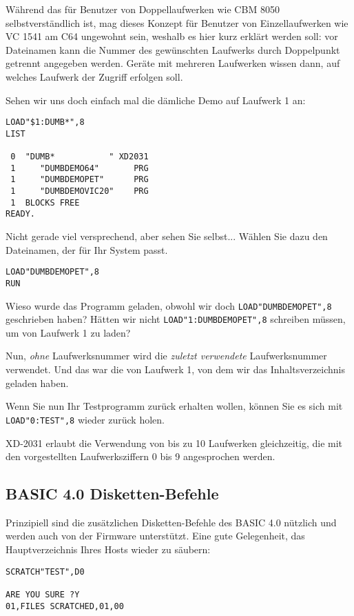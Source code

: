 \documentclass[10pt,a4paper]{scrartcl}		%
\begin{document}
Während das für Benutzer von Doppellaufwerken
wie CBM 8050 selbstverständlich ist, mag dieses Konzept für Benutzer
von Einzellaufwerken wie VC 1541 am C64 ungewohnt sein, weshalb es
hier kurz erklärt werden soll: vor Dateinamen kann die Nummer des gewünschten
Laufwerks durch Doppelpunkt getrennt angegeben werden. Geräte mit
mehreren Laufwerken wissen dann, auf welches Laufwerk der Zugriff
erfolgen soll.

Sehen wir uns doch einfach mal die dämliche Demo auf Laufwerk 1 an:

\begin{verbatim}
LOAD"$1:DUMB*",8
LIST

 0  "DUMB*           " XD2031
 1     "DUMBDEMO64"       PRG
 1     "DUMBDEMOPET"      PRG
 1     "DUMBDEMOVIC20"    PRG
 1  BLOCKS FREE
READY.
\end{verbatim}

Nicht gerade viel versprechend, aber sehen Sie selbst... 
Wählen Sie dazu den Dateinamen, der für Ihr System passt.

\begin{verbatim}
LOAD"DUMBDEMOPET",8
RUN
\end{verbatim}

Wieso wurde das Programm geladen, obwohl wir doch \texttt{LOAD"DUMBDEMOPET",8} 
geschrieben haben? Hätten wir nicht \texttt{LOAD"1:DUMBDEMOPET",8} schreiben müssen,
um von Laufwerk 1 zu laden?

Nun, \textit{ohne} Laufwerksnummer wird die \textit{zuletzt verwendete}
Laufwerksnummer verwendet. Und das war die von Laufwerk 1, von dem wir
das Inhaltsverzeichnis geladen haben.

Wenn Sie nun Ihr Testprogramm zurück erhalten wollen, können Sie
es sich mit \texttt{LOAD"0:TEST",8} wieder zurück holen.

XD-2031 erlaubt die Verwendung von bis zu 10 Laufwerken gleichzeitig,
die mit den vorgestellten Laufwerksziffern 0 bis 9 angesprochen
werden.

\subsection{BASIC 4.0 Disketten-Befehle}
Prinzipiell sind die zusätzlichen Disketten-Befehle des BASIC 4.0
nützlich und werden auch von der Firmware unterstützt. 
Eine gute Gelegenheit, das Hauptverzeichnis Ihres Hosts
wieder zu säubern:

\begin{verbatim}
SCRATCH"TEST",D0

ARE YOU SURE ?Y
01,FILES SCRATCHED,01,00
\end{verbatim}
\end{document}
